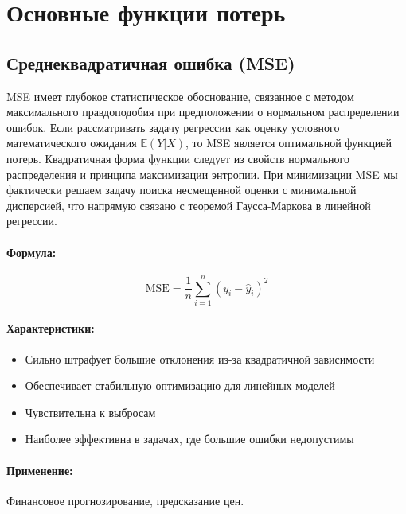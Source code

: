 \documentclass[12pt]{article}
\theoremstyle{definition}
\theoremstyle{definition}
\theoremstyle{definition}
\theoremstyle{remark}
\theoremstyle{remark}
\begin{document}
\section{Основные функции потерь}


\subsection{Среднеквадратичная ошибка (MSE)}

MSE имеет глубокое статистическое обоснование, связанное с методом максимального правдоподобия при предположении о нормальном распределении ошибок. Если рассматривать задачу регрессии как оценку условного математического ожидания $\mathbb{E}(Y|X)$, то MSE является оптимальной функцией потерь. Квадратичная форма функции следует из свойств нормального распределения и принципа максимизации энтропии. При минимизации MSE мы фактически решаем задачу поиска несмещенной оценки с минимальной дисперсией, что напрямую связано с теоремой Гаусса-Маркова в линейной регрессии.

\paragraph{Формула:}
\begin{equation}
    \text{MSE} = \frac{1}{n} \sum_{i=1}^{n} (y_i - \hat{y}_i)^2
\end{equation}

\paragraph{Характеристики:}
\begin{itemize}
    \item Сильно штрафует большие отклонения из-за квадратичной зависимости
    \item Обеспечивает стабильную оптимизацию для линейных моделей
    \item Чувствительна к выбросам
    \item Наиболее эффективна в задачах, где большие ошибки недопустимы
\end{itemize}

\paragraph{Применение:} Финансовое прогнозирование, предсказание цен.
\end{document}
